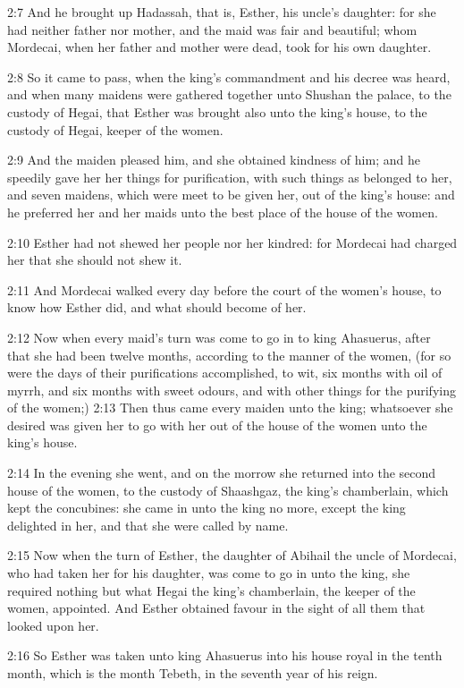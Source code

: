 2:7 And he brought up Hadassah, that is, Esther, his uncle's daughter: for she had neither father nor mother, and the maid was fair and beautiful; whom Mordecai, when her father and mother were dead, took for his own daughter.

2:8 So it came to pass, when the king's commandment and his decree was heard, and when many maidens were gathered together unto Shushan the palace, to the custody of Hegai, that Esther was brought also unto the king's house, to the custody of Hegai, keeper of the women.

2:9 And the maiden pleased him, and she obtained kindness of him; and he speedily gave her her things for purification, with such things as belonged to her, and seven maidens, which were meet to be given her, out of the king's house: and he preferred her and her maids unto the best place of the house of the women.

2:10 Esther had not shewed her people nor her kindred: for Mordecai had charged her that she should not shew it.

2:11 And Mordecai walked every day before the court of the women's house, to know how Esther did, and what should become of her.

2:12 Now when every maid's turn was come to go in to king Ahasuerus, after that she had been twelve months, according to the manner of the women, (for so were the days of their purifications accomplished, to wit, six months with oil of myrrh, and six months with sweet odours, and with other things for the purifying of the women;) 2:13 Then thus came every maiden unto the king; whatsoever she desired was given her to go with her out of the house of the women unto the king's house.

2:14 In the evening she went, and on the morrow she returned into the second house of the women, to the custody of Shaashgaz, the king's chamberlain, which kept the concubines: she came in unto the king no more, except the king delighted in her, and that she were called by name.

2:15 Now when the turn of Esther, the daughter of Abihail the uncle of Mordecai, who had taken her for his daughter, was come to go in unto the king, she required nothing but what Hegai the king's chamberlain, the keeper of the women, appointed. And Esther obtained favour in the sight of all them that looked upon her.

2:16 So Esther was taken unto king Ahasuerus into his house royal in the tenth month, which is the month Tebeth, in the seventh year of his reign.

